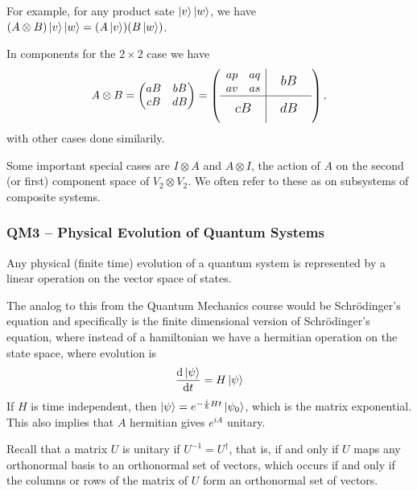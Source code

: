 \documentclass[a4paper]{article}
\begin{document}
For example, for any product sate $\ket{v}\ket{w}$, we have $(A \otimes B) \ket{v} \ket{w} = (A \ket{v})(B \ket{w})$.

In components for the $2\times 2$ case we have
$$
\sbox0{$\begin{matrix}ap&aq\\av&as\end{matrix}$}
A \otimes B = \begin{pmatrix}
	aB & bB \\
	cB & dB
\end{pmatrix} = \left(
	\begin{array}{c|c}
	\usebox{0}&\makebox[\wd0]{\large $bB$}\\
	\hline
	  \vphantom{\usebox{0}}\makebox[\wd0]{\large $cB$}&\makebox[\wd0]{\large $dB$}
	\end{array}
	\right),
$$
with other cases done similarily.

Some important special cases are $I \otimes A$ and $A \otimes I$, the action of $A$ on the second (or first) component space of $V_2 \otimes V_2$. We often refer to these as  on subsystems of composite systems.

\subsubsection{QM3 -- Physical Evolution of Quantum Systems}

\begin{axiom*}[QM3]
	Any physical (finite time) evolution of a quantum system is represented by a  linear operation on the vector space of states.
\end{axiom*}

The analog to this from the Quantum Mechanics course would be Schr\"odinger's equation and specifically is the finite dimensional version of Schr\"odinger's equation, where instead of a hamiltonian we have a hermitian operation on the state space, where evolution is
$$
\frac{\mathrm{d}\ket{\psi}}{\mathrm{d}t} = H \ket{\psi}
$$
If $H$ is time independent, then $\ket{\psi} = e^{-\frac{i}{\hbar}Ht}\ket{\psi_0}$, which is the matrix exponential. This also implies that $A$ hermitian gives $e^{iA}$ unitary.

Recall that a matrix $U$ is unitary if $U^{-1} = U^{\dagger}$, that is, if and only if $U$ maps any orthonormal basis to an orthonormal set of vectors, which occurs if and only if the columns or rows of the matrix of $U$ form an orthonormal set of vectors.
\end{document}
